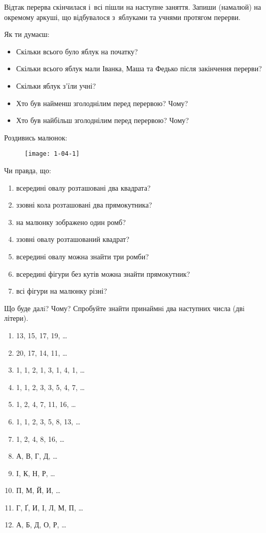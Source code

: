 Відтак перерва скінчилася і~всі пішли на наступне заняття.
Запиши (намалюй) на окремому аркуші, що відбувалося з~яблуками
та учнями протягом перерви.

Як ти думаєш:
\begin{itemize}
    \item Скільки всього було яблук на початку?
    \item Скільки всього яблук мали Іванка, Маша та Федько
    після закінчення перерви?
    \item Скільки яблук з'їли учні?
    \item Хто був найменш зголоднілим перед перервою? Чому?
    \item Хто був найбільш зголоднілим перед перервою? Чому?
\end{itemize}


\problem
Роздивись малюнок:

\begin{figure}[h]
    \centering
    \texttt{[image: 1-04-1]}
\end{figure}

Чи правда, що:
\begin{enumerate}
    \item всередині овалу розташовані два квадрата?
    \item ззовні кола розташовані два прямокутника?
    \item на малюнку зображено один ромб?
    \item ззовні овалу розташований квадрат?
    \item всередині овалу можна знайти три ромби?
    \item всередині фігури без кутів можна знайти прямокутник?
    \item всі фігури на малюнку різні?
\end{enumerate}



\problem
Що буде далi? Чому?
Спробуйте знайти принаймнi два наступних числа (двi літери). 
\begin{enumerate}
    \item 13, 15, 17, 19, \ldots
    \item 20, 17, 14, 11, \ldots
    \item 1, 1, 2, 1, 3, 1, 4, 1, \ldots
    \item 1, 1, 2, 3, 3, 5, 4, 7, \ldots
    \item 1, 2, 4, 7, 11, 16, \ldots
    \item 1, 1, 2, 3, 5, 8, 13, \ldots
    \item 1, 2, 4, 8, 16, \ldots
    \item А, В, Г, Д, \ldots
    \item I, К, Н, Р, \ldots
    \item П, М, Й, И, \ldots
    \item Г, Ґ, И, I, Л, М, П, \ldots
    \item А, Б, Д, О, Р, \ldots
\end{enumerate}


